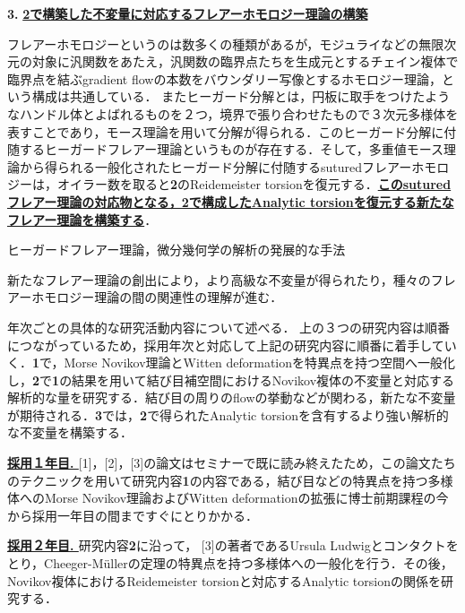\documentclass[11pt,a4j,dvipdfmx]{jarticle} 					%
\newcommand{\研究課題名}{象の卵}
\newcommand{\研究機関名}{京都大学}
\newcommand{\研究代表者氏名}{福士　謙二　　　}
\begin{document}
\noindent
\begin{screen}
\textbf{3. } \textbf{\ul{2で構築した不変量に対応するフレアーホモロジー理論の構築}}

フレアーホモロジーというのは数多くの種類があるが，モジュライなどの無限次元の対象に汎関数をあたえ，汎関数の臨界点たちを生成元とするチェイン複体で臨界点を結ぶgradient flowの本数をバウンダリー写像とするホモロジー理論，という構成は共通している．
またヒーガード分解とは，円板に取手をつけたようなハンドル体とよばれるものを２つ，境界で張り合わせたもので３次元多様体を表すことであり，モース理論を用いて分解が得られる．このヒーガード分解に付随するヒーガードフレアー理論というものが存在する．そして，多重値モース理論から得られる一般化されたヒーガード分解に付随するsuturedフレアーホモロジーは，オイラー数を取ると\textbf{2}のReidemeister torsionを復元する．\textbf{\ul{このsuturedフレアー理論の対応物となる，2で構成したAnalytic torsionを復元する新たなフレアー理論を構築する}}．


ヒーガードフレアー理論，微分幾何学の解析の発展的な手法

新たなフレアー理論の創出により，より高級な不変量が得られたり，種々のフレアーホモロジー理論の間の関連性の理解が進む．



\end{screen}


\noindent
{}

年次ごとの具体的な研究活動内容について述べる．
上の３つの研究内容は順番につながっているため，採用年次と対応して上記の研究内容に順番に着手していく．\textbf{1}で，Morse Novikov理論とWitten deformationを特異点を持つ空間へ一般化し，\textbf{2}で\textbf{1}の結果を用いて結び目補空間におけるNovikov複体の不変量と対応する解析的な量を研究する．結び目の周りのflowの挙動などが関わる，新たな不変量が期待される．\textbf{3}では，\textbf{2}で得られたAnalytic torsionを含有するより強い解析的な不変量を構築する．

\noindent
\textbf{\ul{採用１年目. }}[1]，[2]，[3]の論文はセミナーで既に読み終えたため，この論文たちのテクニックを用いて研究内容\textbf{1}の内容である，結び目などの特異点を持つ多様体へのMorse Novikov理論およびWitten deformationの拡張に博士前期課程の今から採用一年目の間まですぐにとりかかる．

\noindent
\textbf{\ul{採用２年目. }}
研究内容\textbf{2}に沿って，
[3]の著者であるUrsula Ludwigとコンタクトをとり，Cheeger-M\"{u}llerの定理の特異点を持つ多様体への一般化を行う．その後，Novikov複体におけるReidemeister torsionと対応するAnalytic torsionの関係を研究する．
\end{document}
